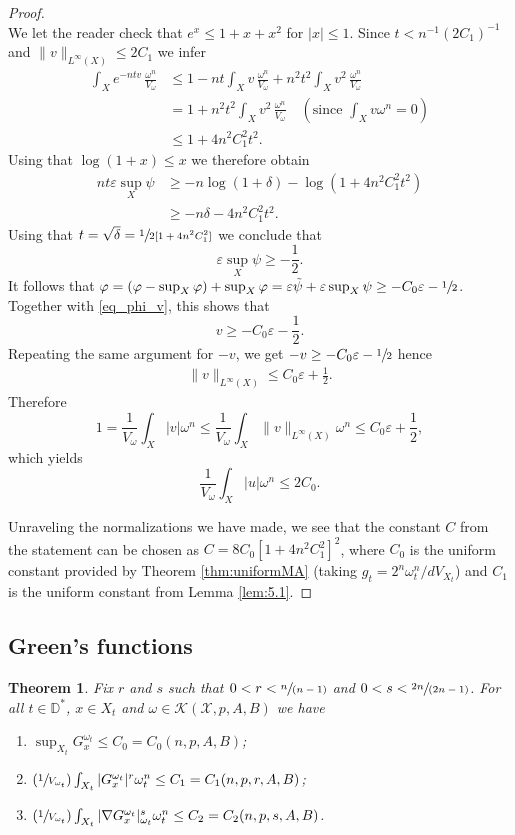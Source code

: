 \documentclass[11pt]{article}
\newcommand{\Subsection}{\subsection}
\numberwithin{equation}{section}
\newcommand{\Psfrac}[2]{(\sfrac{#1}{#2})}
\newcommand{\spfrac}[2]{\sfrac{#1}{(#2)}}
\newtheorem{theorem}{Theorem}[section]
\theoremstyle{definition}
\newcommand{\D}{\mathbb D}
\begin{document}
\begin{proof}
\[\]
We let the reader check that $e^x \leq 1+x+x^2$ for $|x| \leq 1$.
Since $t<n^{-1}(2C_1)^{-1}$ and $\|v\|_{L^{\infty}(X)} \leq 2C_1$ we infer
\begin{align*}
\int_X e^{-ntv}\,\frac{\omega^n}{V_\omega}&\leq 1- nt\int_X v\,\frac{\omega^n}{V_\omega} + n^2 t^2\int_X v^2\,\frac{\omega^n}{V_\omega}\\
&= 1+ n^2 t^2\int_X v^2\,\frac{\omega^n}{V_\omega} \quad (\text{since } \int_X v\omega^n=0) \\
&\leq 1+ 4n^2 C_1^2 t^2.
\end{align*}
Using that $\log(1+x) \leq x$ we therefore obtain
\begin{align*}
nt\varepsilon \sup_X \psi &\geq - n\log(1+\delta)- \log \left(1+4n^2C_1^2 t^2 \right)\\
&\geq - n \delta -4n^2 C_1^2 t^2.
\end{align*}
Using that $t= \sqrt{\delta}=\sfrac{1}{2[1+4n^2C_1^2]}$ we conclude that
\[
\varepsilon \sup_X \psi \geq -\frac{1}{2}.
\]
It follows that
$ \varphi= (\varphi -\sup_X \varphi)+ \sup_X \varphi = \varepsilon \tilde{\psi}+ \varepsilon \sup_X \psi
\geq -C_0 \varepsilon -\sfrac{1}{2}$.
Together with \eqref{eq_phi_v}, this shows that
\[
v\geq - C_0 \varepsilon - \frac{1}{2}.
\]
Repeating the same argument for $-v$, we get $-v\geq - C_0\varepsilon - \sfrac{1}{2}$ hence
\begin{align*}
\|v\|_{L^\infty(X)}\leq C_0 \varepsilon+ \frac{1}{2}.
\end{align*}
Therefore
\[
1=\frac{1}{V_\omega}\int_X |v|\omega^n\leq \frac{1}{V_\omega}\int_X \|v\|_{L^\infty(X)}\omega^n \leq C_0 \varepsilon+ \frac{1}{2},
\]
which yields
\[
\frac{1}{V_\omega} \int_X |u|\omega^n \leq 2 C_0.
\]

Unraveling the normalizations we have made, we see that the constant $C$ from the statement can be chosen as
$C=8C_0[1+4n^2C_1^2]^2$, where $C_0$ is the uniform constant provided by Theorem \ref{thm:uniformMA}
(taking $g_t=2^n \omega_t^n/dV_{X_t}$)
and $C_1$ is the uniform constant from Lemma \ref{lem:5.1}.
\end{proof}

\Subsection{Green's functions} \label{sec:green}

\begin{theorem} \label{thm:Green1}
Fix $r$ and $s$ such that $0<r<\spfrac{n}{n-1}$ and $0<s< \spfrac{2n}{2n-1}$.
For all $t \in \D^*$, $x \in X_t$ and $\omega \in {\mathcal K}(\mathcal{X},p,A,B)$ we have
\begin{enumerate}
\item\label{thm:Green11} $\sup_{X_t} G^{\omega_t}_x \leq C_0=C_0(n,p,A,B)$;

\item\label{thm:Green12} $\Psfrac{1}{V_{\omega_t}} \int_{X_t} |G^{\omega_t}_x|^r \omega_t^n \leq C_1=C_1(n,p,r,A,B)$;

\item\label{thm:Green13} $\Psfrac{1}{V_{\omega_t}} \int_{X_t} |\nabla G^{\omega_t}_x|_{\omega_t}^s \omega_t^n \leq C_2=C_2(n,p,s,A,B)$.
\end{enumerate}
\end{theorem}
\end{document}
